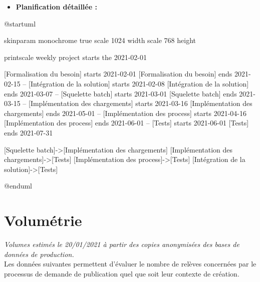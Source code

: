 \documentclass[a4paper, 12pt]{report}
\begin{document}
\begin{itemize}
  \item \textbf{Planification détaillée :}\\
\end{itemize}

\begin{center}
  \begin{plantuml}
    @startuml

    skinparam monochrome true
    scale 1024 width
    scale 768 height

    printscale weekly
    project starts the 2021-02-01

    [Formalisation du besoin] starts 2021-02-01
    [Formalisation du besoin] ends 2021-02-15
    --
    [Intégration de la solution] starts 2021-02-08
    [Intégration de la solution] ends 2021-03-07
    --
    [Squelette batch] starts 2021-03-01
    [Squelette batch] ends 2021-03-15
    --
    [Implémentation des chargements] starts 2021-03-16
    [Implémentation des chargements] ends 2021-05-01
    --
    [Implémentation des process] starts 2021-04-16
    [Implémentation des process] ends 2021-06-01
    --
    [Tests] starts 2021-06-01
    [Tests] ends 2021-07-31

    [Squelette batch]->[Implémentation des chargements]
    [Implémentation des chargements]->[Tests]
    [Implémentation des process]->[Tests]
    [Intégration de la solution]->[Tests]

    @enduml
  \end{plantuml}
\end{center}

\chapter{Volumétrie}
\label{appendix:volumetrie}

\textit{Volumes estimés le 20/01/2021 à partir des copies anonymisées des bases de données de production.}\\

Les données suivantes permettent d'évaluer le nombre de relèves concernées par le processus de demande de publication quel que soit leur contexte de création.\\
\end{document}
